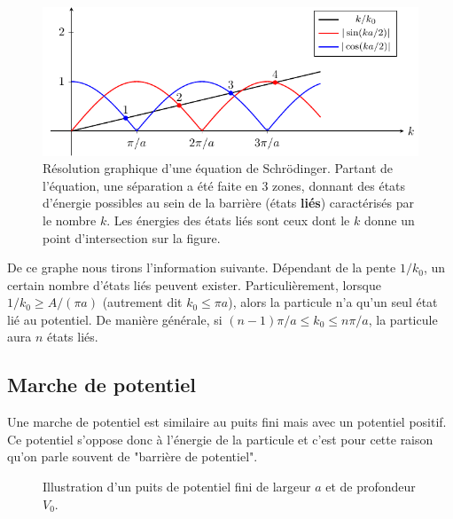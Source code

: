 \documentclass{book}
\begin{document}
\begin{figure}[h]
  \centering
  \includegraphics{images/chap2-puits_fini_solutions.pdf}
  \caption{Résolution graphique d'une équation de Schrödinger. Partant de l'équation, une séparation a été faite en 3 zones, donnant des états d'énergie possibles au sein de la barrière (états \textbf{liés}) caractérisés par le nombre $k$. Les énergies des états liés sont ceux dont le $k$ donne un point d'intersection sur la figure.}
\end{figure}

De ce graphe nous tirons l'information suivante.
Dépendant de la pente $1/k_0$, un certain nombre d'états liés peuvent exister. Particulièrement, lorsque $1/k_0  \geq A/(\pi a)$ (autrement dit $k_0 \leq \pi a$), alors la particule n'a qu'un seul état lié au potentiel. De manière générale, si $(n-1)\pi/a \leq k_0 \leq n\pi/a$, la particule aura $n$ états liés.



\subsection{Marche de potentiel}
Une marche de potentiel est similaire au puits fini mais avec un potentiel positif. Ce potentiel s'oppose donc à l'énergie de la particule et c'est pour cette raison qu'on parle souvent de "barrière de potentiel".

\begin{figure}[h]
  \centering
  \scalebox{1.2}{}
  \caption{Illustration d'un puits de potentiel fini de largeur $a$ et de profondeur $V_0$.}
  \label{fig:chap2-marche_potentiel}
\end{figure}
\end{document}
